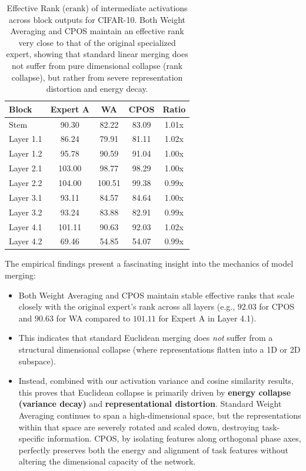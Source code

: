 \documentclass{article}
\theoremstyle{plain}
\theoremstyle{definition}
\theoremstyle{remark}
\begin{document}
\begin{table}[h]
\caption{Effective Rank ($\text{erank}$) of intermediate activations across block outputs for CIFAR-10. Both Weight Averaging and CPOS maintain an effective rank very close to that of the original specialized expert, showing that standard linear merging does not suffer from pure dimensional collapse (rank collapse), but rather from severe representation distortion and energy decay.}
\label{tab:effective_rank}
\begin{center}
\begin{small}
\begin{sc}
\begin{tabular}{lcccc}
\toprule
Block & Expert A & WA & CPOS & Ratio \\
\midrule
Stem & 90.30 & 82.22 & 83.09 & 1.01x \\
Layer 1.1 & 86.24 & 79.91 & 81.11 & 1.02x \\
Layer 1.2 & 95.78 & 90.59 & 91.04 & 1.00x \\
Layer 2.1 & 103.00 & 98.77 & 98.29 & 1.00x \\
Layer 2.2 & 104.00 & 100.51 & 99.38 & 0.99x \\
Layer 3.1 & 93.11 & 84.57 & 84.64 & 1.00x \\
Layer 3.2 & 93.24 & 83.88 & 82.91 & 0.99x \\
Layer 4.1 & 101.11 & 90.63 & 92.03 & 1.02x \\
Layer 4.2 & 69.46 & 54.85 & 54.07 & 0.99x \\
\bottomrule
\end{tabular}
\end{sc}
\end{small}
\end{center}
\end{table}

The empirical findings present a fascinating insight into the mechanics of model merging:
\begin{itemize}
\item Both Weight Averaging and CPOS maintain stable effective ranks that scale closely with the original expert's rank across all layers (e.g., $92.03$ for CPOS and $90.63$ for WA compared to $101.11$ for Expert A in Layer 4.1).
\item This indicates that standard Euclidean merging does \emph{not} suffer from a structural dimensional collapse (where representations flatten into a 1D or 2D subspace).
\item Instead, combined with our activation variance and cosine similarity results, this proves that Euclidean collapse is primarily driven by \textbf{energy collapse (variance decay)} and \textbf{representational distortion}. Standard Weight Averaging continues to span a high-dimensional space, but the representations within that space are severely rotated and scaled down, destroying task-specific information. CPOS, by isolating features along orthogonal phase axes, perfectly preserves both the energy and alignment of task features without altering the dimensional capacity of the network.
\end{itemize}
\end{document}
